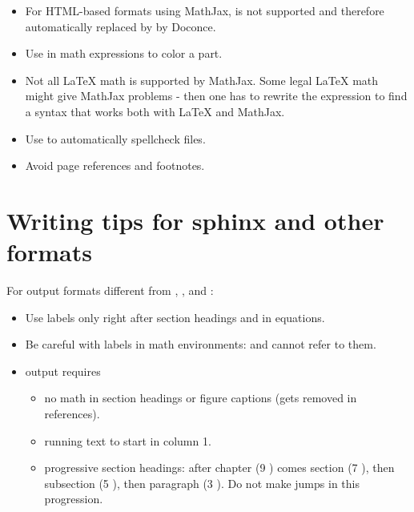\documentclass[%
twoside,                 %
draft,                   %
final,                   %
chapterprefix=true,      %
open=right               %
10pt]{book}
\newcounter{doconce:movie:counter}
\newcounter{doconce:exercise:counter}
\begin{document}
\begin{shadedquoteBlue}
\begin{itemize}
 \item For HTML-based formats using MathJax,  is not supported
   and therefore automatically replaced by  by Doconce.

 \item Use \code{\\textcolor{blue}{formula}} in math expressions to color a part.

 \item Not all {\LaTeX} math is supported by MathJax. Some legal {\LaTeX} math
   might give MathJax problems - then one has to rewrite the expression
   to find a syntax that works both with {\LaTeX} and MathJax.

 \item Use  to automatically spellcheck files.

 \item Avoid page references and footnotes.
\end{itemize}

\noindent
\section*{Writing tips for sphinx and other formats}

For output formats different from , , and :

\begin{itemize}
 \item Use labels only right after section headings and in equations.

 \item Be careful with labels in  math environments: 
   and  cannot refer to them.

 \item {} output requires
\begin{itemize}

   \item no math in section headings or figure captions
     (gets removed in references).

   \item running text to start in column 1.

   \item progressive section headings: after chapter (9 \code{=}) comes
     section (7 \code{=}), then subsection (5 \code{=}), then paragraph
     (3 \code{=}). Do not make jumps in this progression.


\end{itemize}
\end{itemize}
\end{shadedquoteBlue}
\end{document}
